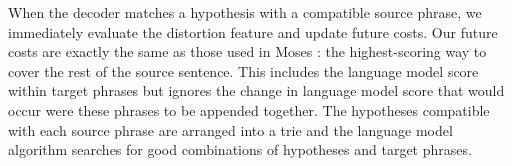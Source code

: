 \documentclass[11pt]{article}
\begin{document}
When the decoder matches a hypothesis with a compatible source phrase, we immediately evaluate the distortion feature and update future costs.  Our future costs are exactly the same as those used in Moses \cite{moses}: the highest-scoring way to cover the rest of the source sentence.  This includes the language model score within target phrases but ignores the change in language model score that would occur were these phrases to be appended together.  The hypotheses compatible with each source phrase are arranged into a trie and the language model algorithm searches for good combinations of hypotheses and target phrases.  



\end{document}

